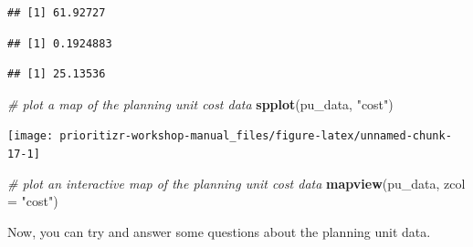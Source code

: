 \documentclass[12pt,]{book}
\newenvironment{Shaded}{\begin{snugshade}}{\end{snugshade}}
\newcommand{\KeywordTok}[1]{\textcolor[rgb]{0.13,0.29,0.53}{\textbf{#1}}}
\newcommand{\DataTypeTok}[1]{\textcolor[rgb]{0.13,0.29,0.53}{#1}}
\newcommand{\StringTok}[1]{\textcolor[rgb]{0.31,0.60,0.02}{#1}}
\newcommand{\CommentTok}[1]{\textcolor[rgb]{0.56,0.35,0.01}{\textit{#1}}}
\newcommand{\OperatorTok}[1]{\textcolor[rgb]{0.81,0.36,0.00}{\textbf{#1}}}
\newcommand{\NormalTok}[1]{#1}
\begin{document}
\begin{verbatim}
## [1] 61.92727
\end{verbatim}

\begin{Shaded}
\end{Shaded}

\begin{verbatim}
## [1] 0.1924883
\end{verbatim}

\begin{Shaded}
\end{Shaded}

\begin{verbatim}
## [1] 25.13536
\end{verbatim}

\begin{Shaded}
\begin{Highlighting}[]
\CommentTok{# plot a map of the planning unit cost data}
\KeywordTok{spplot}\NormalTok{(pu_data, }\StringTok{"cost"}\NormalTok{)}
\end{Highlighting}
\end{Shaded}

\begin{center}\texttt{[image: prioritizr-workshop-manual\_files/figure-latex/unnamed-chunk-17-1]} \end{center}

\begin{Shaded}
\begin{Highlighting}[]
\CommentTok{# plot an interactive map of the planning unit cost data}
\KeywordTok{mapview}\NormalTok{(pu_data, }\DataTypeTok{zcol =} \StringTok{"cost"}\NormalTok{)}
\end{Highlighting}
\end{Shaded}

Now, you can try and answer some questions about the planning unit data.
\end{document}
